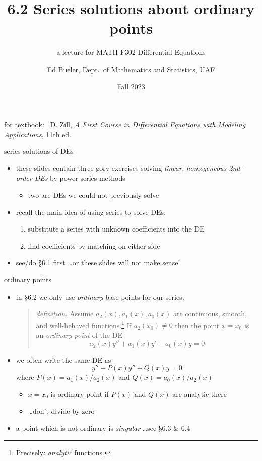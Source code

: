 \documentclass[dvipsnames,colorlinks]{beamer}
\title{6.2 Series solutions about ordinary points}
\subtitle{a lecture for MATH F302 Differential Equations}
\author{Ed Bueler, Dept.~of Mathematics and Statistics, UAF}
\date{Fall 2023}
\begin{document}


\begin{frame}
\titlepage

\centerline{\tiny for textbook: \, D. Zill, \emph{A First Course in Differential Equations with Modeling Applications}, 11th ed.}
\end{frame}

\begin{frame}{series solutions of DEs}

\begin{itemize}
\item these slides contain \alert{three gory exercises} solving \emph{linear, homogeneous 2nd-order DEs} by power series methods
    \begin{itemize}
    \item two are DEs we could not previously solve
    \end{itemize}
\item recall the main idea of using series to solve DEs:

\medskip
\begin{enumerate}
\item substitute a series with unknown coefficients into the DE
\item find coefficients by matching on either side
\end{enumerate}

\medskip
\item see/do \S6.1 first \dots or these slides will not make sense!
\end{itemize}
\end{frame}


\begin{frame}{ordinary points}

\begin{itemize}
\item in \S6.2 we only use \emph{ordinary} base points for our series:

\medskip
\begin{quote}\normalfont
\emph{definition.}  Assume $a_2(x),a_1(x),a_0(x)$ are continuous, smooth, and well-behaved functions.\footnote{Precisely: \emph{analytic} functions.}  If $a_2(x_0)\ne 0$ then the point $x=x_0$ is an \emph{ordinary point} of the DE
    $$a_2(x) y'' + a_1(x) y' + a_0(x) y = 0$$
\end{quote}

\item we often write the same DE as
    $$y'' + P(x) y'' + Q(x) y = 0$$
where $P(x)=a_1(x)/a_2(x)$ and $Q(x)=a_0(x)/a_2(x)$
    \begin{itemize}
    \item $x=x_0$ is ordinary point if $P(x)$ and $Q(x)$ are analytic there
    \item \dots don't divide by zero
    \end{itemize}
\item a point which is not ordinary is \emph{singular} \dots see \S 6.3 \& 6.4

\bigskip
\end{itemize}
\end{frame}
\end{document}

